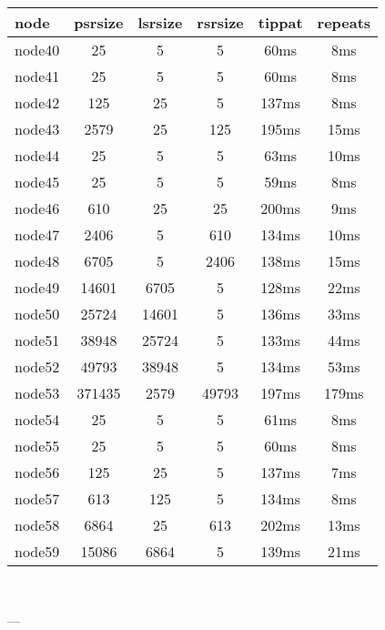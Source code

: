 \begin{tabular}{|l|c|c|c|c|c|}
\hline node & psrsize & lsrsize & rsrsize   & tippat & repeats\\
    \hline node40 & 25 & 5 & 5 & 60ms & 8ms\\
    \hline node41 & 25 & 5 & 5 & 60ms & 8ms\\
    \hline node42 & 125 & 25 & 5 & 137ms & 8ms\\
    \hline node43 & 2579 & 25 & 125 & 195ms & 15ms\\
    \hline node44 & 25 & 5 & 5 & 63ms & 10ms\\
    \hline node45 & 25 & 5 & 5 & 59ms & 8ms\\
    \hline node46 & 610 & 25 & 25 & 200ms & 9ms\\
    \hline node47 & 2406 & 5 & 610 & 134ms & 10ms\\
    \hline node48 & 6705 & 5 & 2406 & 138ms & 15ms\\
    \hline node49 & 14601 & 6705 & 5 & 128ms & 22ms\\
    \hline node50 & 25724 & 14601 & 5 & 136ms & 33ms\\
    \hline node51 & 38948 & 25724 & 5 & 133ms & 44ms\\
    \hline node52 & 49793 & 38948 & 5 & 134ms & 53ms\\
    \hline node53 & 371435 & 2579 & 49793 & 197ms & 179ms\\
    \hline node54 & 25 & 5 & 5 & 61ms & 8ms\\
    \hline node55 & 25 & 5 & 5 & 60ms & 8ms\\
    \hline node56 & 125 & 25 & 5 & 137ms & 7ms\\
    \hline node57 & 613 & 125 & 5 & 134ms & 8ms\\
    \hline node58 & 6864 & 25 & 613 & 202ms & 13ms\\
    \hline node59 & 15086 & 6864 & 5 & 139ms & 21ms\\

\hline
\end{tabular} \

---


